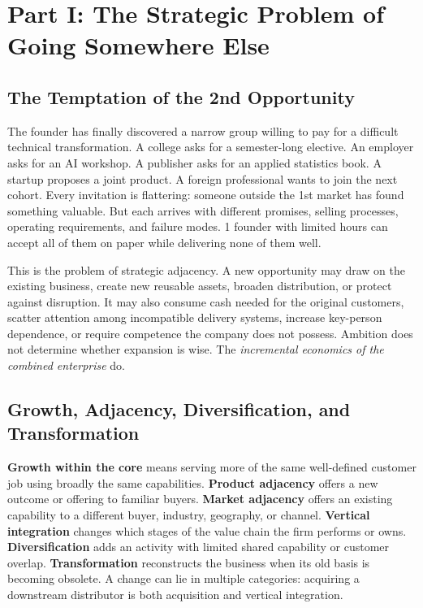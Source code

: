 \section*{Part I: The Strategic Problem of Going Somewhere Else}
\label{sec:part1_strategic_problem_of_going_somewhere_else}

\subsection{The Temptation of the 2nd Opportunity}
\label{sec:temptation_second_opportunity}

The founder has finally discovered a narrow group willing to pay for a difficult technical transformation. A college asks for a semester-long elective. An employer asks for an AI workshop. A publisher asks for an applied statistics book. A startup proposes a joint product. A foreign professional wants to join the next cohort. Every invitation is flattering: someone outside the 1st market has found something valuable. But each arrives with different promises, selling processes, operating requirements, and failure modes. 1 founder with limited hours can accept all of them on paper while delivering none of them well.

This is the problem of strategic adjacency. A new opportunity may draw on the existing business, create new reusable assets, broaden distribution, or protect against disruption. It may also consume cash needed for the original customers, scatter attention among incompatible delivery systems, increase key-person dependence, or require competence the company does not possess. Ambition does not determine whether expansion is wise. The \textit{incremental economics of the combined enterprise} do.

\subsection{Growth, Adjacency, Diversification, and Transformation}
\label{sec:growth_adjacency_diversification_transformation}

\textbf{Growth within the core} means serving more of the same well-defined customer job using broadly the same capabilities. \textbf{Product adjacency} offers a new outcome or offering to familiar buyers. \textbf{Market adjacency} offers an existing capability to a different buyer, industry, geography, or channel. \textbf{Vertical integration} changes which stages of the value chain the firm performs or owns. \textbf{Diversification} adds an activity with limited shared capability or customer overlap. \textbf{Transformation} reconstructs the business when its old basis is becoming obsolete. A change can lie in multiple categories: acquiring a downstream distributor is both acquisition and vertical integration.

